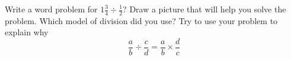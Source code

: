 \documentclass{ximera}
\begin{document}
%
%

%
%

\begin{problem}
Write a word problem for $1 \frac{3}{4} \div \frac{1}{2}$?  Draw a picture that will help you solve the problem.  Which model of division did you use?  Try to use your problem to explain why 
$$\frac{a}{b}\div\frac{c}{d}=\frac{a}{b}\times\frac{d}{c}$$
\begin{freeResponse}
\end{freeResponse}
\end{problem}
\end{document}
